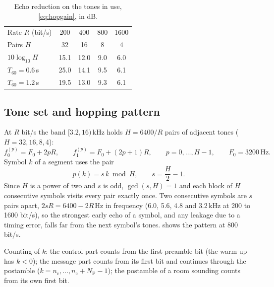 \documentclass[11pt,a4paper]{article}
\newcommand{\kHz}{\,\mathrm{kHz}}
\newcommand{\Hz}{\,\mathrm{Hz}}
\newcommand{\NP}{N_{\mathrm{P}}}
\newcommand{\nc}{n_{\mathrm{c}}}
\theoremstyle{remark}
\begin{document}
\begin{table}[ht]
\centering
\caption{Echo reduction on the tones in use, \cref{eq:hopgain}, in dB.}
\label{tab:hopgain}
\begin{tabular}{lcccc}
\toprule
Rate $R$ (bit/s) & 200 & 400 & 800 & 1600\\
Pairs $H$ & 32 & 16 & 8 & 4\\
\midrule
$10\log_{10} H$ & 15.1 & 12.0 & 9.0 & 6.0\\
$T_{60} = 0.6$\,s & 25.0 & 14.1 & 9.5 & 6.1\\
$T_{60} = 1.2$\,s & 19.5 & 13.0 & 9.3 & 6.1\\
\bottomrule
\end{tabular}
\end{table}

\subsection{Tone set and hopping pattern}
At $R$ bit/s the band $[3.2, 16)\kHz$ holds $H = 6400/R$ pairs of adjacent tones ($H = 32, 16, 8, 4$):
\begin{equation}
f_0^{(p)} = F_0 + 2pR, \qquad f_1^{(p)} = F_0 + (2p+1)R, \qquad p = 0, \dots, H-1, \qquad F_0 = 3200\Hz.
\label{eq:hoptones}
\end{equation}
Symbol $k$ of a segment uses the pair
\begin{equation}
p(k) = s\,k \bmod H, \qquad s = \frac{H}{2} - 1 .
\label{eq:hoppattern}
\end{equation}
Since $H$ is a power of two and $s$ is odd, $\gcd(s, H) = 1$ and each block of $H$ consecutive symbols visits every pair exactly once. Two consecutive symbols are $s$ pairs apart, $2sR = 6400 - 2R\Hz$ in frequency (6.0, 5.6, 4.8 and $3.2\kHz$ at 200 to 1600 bit/s), so the strongest early echo of a symbol, and any leakage due to a timing error, falls far from the next symbol's tones.  shows the pattern at 800 bit/s.

Counting of $k$: the control part counts from the first preamble bit (the warm-up has $k<0$); the message part counts from its first bit and continues through the postamble ($k = \nc, \dots, \nc + \NP - 1$); the postamble of a room sounding counts from its own first bit.
\end{document}
